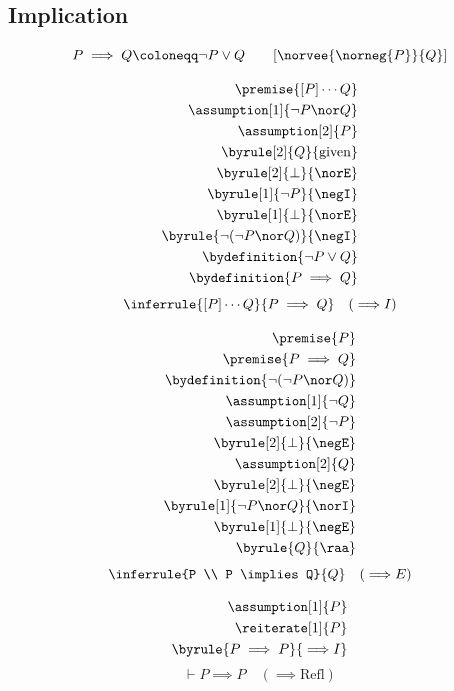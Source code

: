 \subsection{Implication}

\newcommand{\norimplies}[2]{\norvee{\norneg{#1}}{#2}}
\begin{notation}
    \[P \implies Q \coloneqq \neg P \vee Q \qquad [\norimplies{P}{Q}]\]
\end{notation}

\begin{align*}
    \premise{[P] \cdots Q}\\
    \assumption[1]{\neg P \nor Q}\\
    \assumption[2]{P}\\
    \byrule[2]{Q}{\text{given}}\\
    \byrule[2]{\bot}{\norE}\\
    \byrule[1]{\neg P}{\negI}\\
    \byrule[1]{\bot}{\norE}\\
    \byrule{\neg(\neg P \nor Q)}{\negI}\\
    \bydefinition{\neg P \vee Q}\\
    \bydefinition{P \implies Q}
\end{align*}
\newcommand{\impliesI}{{\implies}I}
\[\inferrule{[P] \cdots Q}{P \implies Q} \quad (\impliesI)\]

\begin{align*}
    \premise{P}\\
    \premise{P \implies Q}\\
    \bydefinition{\neg(\neg P \nor Q)}\\
    \assumption[1]{\neg Q}\\
    \assumption[2]{\neg P}\\
    \byrule[2]{\bot}{\negE}\\
    \assumption[2]{Q}\\
    \byrule[2]{\bot}{\negE}\\
    \byrule[1]{\neg P \nor Q}{\norI}\\
    \byrule[1]{\bot}{\negE}\\
    \byrule{Q}{\raa}
\end{align*}
\newcommand{\impliesE}{{\implies}E}
\[\inferrule{P \\ P \implies Q}{Q} \quad (\impliesE)\]

\begin{align*}
    \assumption[1]{P}\\
    \reiterate[1]{P}\\
    \byrule{P \implies P}{\impliesI}    
\end{align*}
\newcommand{\impliesR}{{\implies}\text{Refl}}
\[\vdash P \implies P \quad (\impliesR)\]
